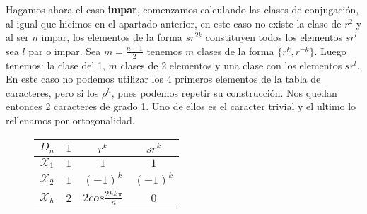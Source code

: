 Hagamos ahora el caso \textbf{impar}, comenzamos calculando las clases de conjugación, al igual que hicimos en el apartado anterior, en este caso no existe la clase de \(r^{2}\) y al ser \(n\) impar, los elementos de la forma \(sr^{2k}\) constituyen todos los elementos \(sr^{l}\) sea \(l\) par o impar. Sea \(m = \frac{n-1}{2}\) tenemos \(m\) clases de la forma \(\{r^{k}, r^{-k}\}\).   Luego tenemos: la clase del 1, \(m\) clases de 2 elementos y una clase con los elementos \(sr^{l}\).\\

En este caso no podemos utilizar los 4 primeros elementos de la tabla de caracteres, pero si los \(\rho^{h}\), pues podemos repetir su construcción. Nos quedan entonces 2 caracteres de grado 1. Uno de ellos es el caracter trivial y el ultimo lo rellenamos por ortogonalidad.

\begin{figure}[H]
  \centering
  \begin{tabular}{c|ccc}
      \(D_{n}\)           & \(1\)   & \(r^{k}\)  & \(sr^{k}\) \\ \hline
      \(\mathcal{X}_{1}\) & \(1\)   &  \(1\)    &     \(1\)    \\
      \(\mathcal{X}_{2}\) & \(1\)   &  \((-1)^{k}\)     &     \((-1)^{k}\)   \\
      \(\mathcal{X}_{h}\) & \(2\)   &  \(2 cos{\frac{2hk\pi}{n}}\)    &     \(0\) \\
    \end{tabular}
\end{figure}
